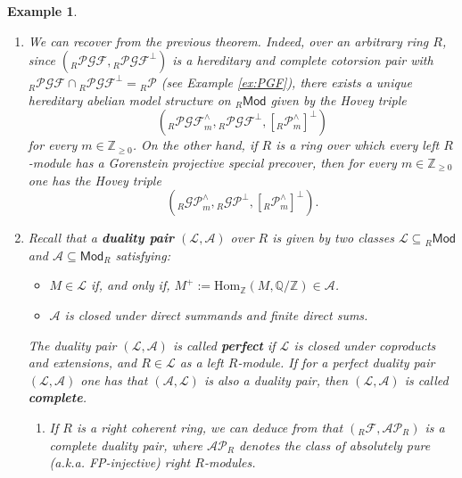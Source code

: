 \documentclass[10pt,reqno]{amsart}
\numberwithin{equation}{section}
\newtheorem{example}[definition]{Example}
\theoremstyle{remark}
\newcommand{\Hom}{\mathrm{Hom}}
\begin{document}
\begin{example}\label{ex:Gorenstein-models-Rmod} ~\
\begin{enumerate}[(1)]
\item We can recover \cite[Coroll. 2.6 (2) \& Thm. 3.4]{Chains} from the previous theorem. Indeed, over an arbitrary ring $R$, since $({}_R\mathcal{PGF},{}_R\mathcal{PGF}^\perp)$ is a hereditary and complete cotorsion pair with ${}_R\mathcal{PGF} \cap {}_R\mathcal{PGF}^\perp = {}_R\mathcal{P}$ (see Example \ref{ex:PGF}), there exists a unique hereditary abelian model structure on ${}_R\mathsf{Mod}$ given by the Hovey triple 
\[
({}_R\mathcal{PGF}^\wedge_m,{}_R\mathcal{PGF}^\perp,[{}_R\mathcal{P}^\wedge_m]^\perp)
\]
for every $m \in \mathbb{Z}_{\geq 0}$. On the other hand, if $R$ is a ring over which every left $R$-module has a Gorenstein projective special precover, then for every $m \in \mathbb{Z}_{\geq 0}$ one has the Hovey triple 
\[
({}_R\mathcal{GP}^\wedge_m,{}_R\mathcal{GP}^\perp,[{}_R\mathcal{P}^\wedge_m]^\perp).
\] 

\item Recall that a \textbf{duality pair} $(\mathcal{L,A})$ over $R$ is given by two classes $\mathcal{L} \subseteq {}_R\mathsf{Mod}$ and $\mathcal{A} \subseteq \mathsf{Mod}_R$ satisfying:
\begin{itemize}
\item $M \in \mathcal{L}$ if, and only if, $M^+ := \Hom_{\mathbb{Z}}(M,\mathbb{Q/Z}) \in \mathcal{A}$.

\item $\mathcal{A}$ is closed under direct summands and finite direct sums. 
\end{itemize}
The duality pair $(\mathcal{L,A})$ is called \textbf{perfect} if $\mathcal{L}$ is closed under coproducts and extensions, and $R \in \mathcal{L}$ as a left $R$-module. If for a perfect duality pair $(\mathcal{L,A})$ one has that $(\mathcal{A,L})$ is also a duality pair, then $(\mathcal{L,A})$ is called \textbf{complete}. 
\begin{enumerate}
\item[(i)] If $R$ is a right coherent ring, we can deduce from \cite{Fieldhouse} that $({}_R\mathcal{F},\mathcal{AP}_R)$ is a complete duality pair, where $\mathcal{AP}_R$ denotes the class of absolutely pure (a.k.a. FP-injective) right $R$-modules. 


\end{enumerate}
\end{enumerate}
\end{example}
\end{document}
